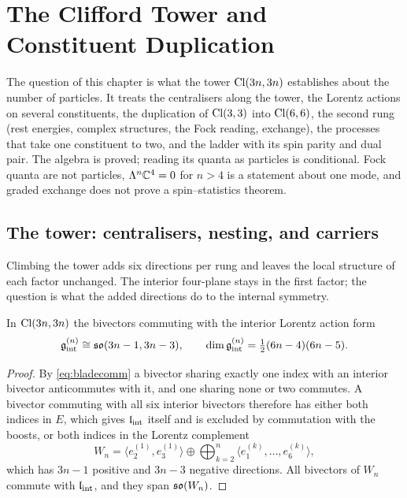 \chapter{The Clifford Tower and Constituent Duplication}
\label{ch:ch05_tower}

The question of this chapter is what the tower $\mathrm{Cl}(3n,3n)$ establishes about the number of particles. It treats the centralisers
along the tower, the Lorentz actions on several constituents, the duplication of $\mathrm{Cl}(3,3)$ into $\mathrm{Cl}(6,6)$, the second rung (rest
energies, complex structures, the Fock reading, exchange), the processes that take one constituent to two, and the ladder with its spin
parity and dual pair. The algebra is proved; reading its quanta as particles is conditional. Fock quanta are not particles,
$\Lambda^n\mathbb{C}^4=0$ for $n>4$ is a statement about one mode, and graded exchange does not prove a spin--statistics theorem.




\section{The tower: centralisers, nesting, and carriers}
\label{sec:tower}

Climbing the tower adds six directions per rung and leaves the local structure of each factor unchanged. The interior four-plane
stays in the first factor; the question is what the added directions do to the internal symmetry.

\begin{theorem}
\label{thm:centraliser}
In $\mathrm{Cl}(3n,3n)$ the bivectors commuting with the interior Lorentz action form
\[
\mathfrak g_{\rm int}^{(n)}\cong\mathfrak{so}(3n-1,3n-3),\qquad \dim\mathfrak g_{\rm int}^{(n)}=\tfrac12(6n-4)(6n-5).
\]
\end{theorem}

\begin{proof}
By \eqref{eq:bladecomm} a bivector sharing exactly one index with an interior bivector anticommutes with it, and one sharing none
or two commutes. A bivector commuting with all six interior bivectors therefore has either both indices in $E$, which gives
$\mathfrak l_{\rm int}$ itself and is excluded by commutation with the boosts, or both indices in the Lorentz complement
\[
W_n=\langle e^{(1)}_2,e^{(1)}_3\rangle\oplus\bigoplus_{k=2}^n\langle e^{(k)}_1,\dots,e^{(k)}_6\rangle ,
\]
which has $3n-1$ positive and $3n-3$ negative directions. All bivectors of $W_n$ commute with $\mathfrak l_{\rm int}$, and they span $\mathfrak{so}(W_n)$.
\end{proof}

